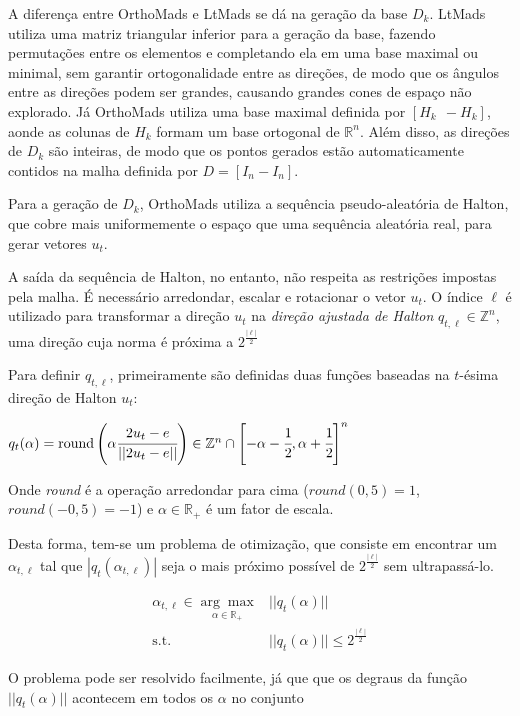 A diferença entre OrthoMads e LtMads se dá na geração da base $D_k$. 
%
LtMads utiliza uma matriz triangular inferior para a geração da base, fazendo permutações entre os elementos e completando ela em uma base maximal ou minimal, sem garantir ortogonalidade entre as direções, de modo que os ângulos entre as direções podem ser grandes, causando grandes cones de espaço não explorado.
%
Já OrthoMads utiliza uma base maximal definida por $[H_k~~ -H_k]$, aonde as colunas de $H_k$ formam um base ortogonal de $\mathbb{R}^n$. Além disso, as direções de $D_k$ são inteiras, de modo que os pontos gerados estão automaticamente contidos na malha definida por $D=[I_n -I_n]$.

Para a geração de $D_k$, OrthoMads utiliza a sequência pseudo-aleatória de Halton, que cobre mais uniformemente o espaço que uma sequência aleatória real, para  gerar vetores $u_t$.

A saída da sequência de Halton, no entanto, não respeita as restrições impostas pela malha. É necessário arredondar, escalar e rotacionar o vetor $u_t$. O índice $\ell$ é utilizado para transformar a direção $u_t$ na \textit{direção ajustada de Halton} $q_{t,\ell} \in \mathbb{Z}^n$, uma direção cuja norma é próxima a $2^{\frac{|\ell|}{2}}$


Para definir $q_{t,\ell}$, primeiramente são definidas duas funções baseadas na $t$-ésima direção de Halton $u_t$:

$q_t(\alpha) = \text{round} \left ( \alpha \cfrac{2u_t - e}{||2u_t - e||} \right ) \in \mathbb{Z}^n \cap \left [ -\alpha - \cfrac{1}{2}, \alpha + \cfrac{1}{2}  \right ]^n$
	
Onde \textit{round} é a operação arredondar para cima ($round(0,5)=1$, $round(-0,5) = -1$) e $\alpha \in \mathbb{R}_+$ é um fator de escala. 

Desta forma, tem-se um problema de otimização, que consiste em encontrar um $\alpha_{t,\ell}$ tal que $|q_t(\alpha_{t,\ell})|$ seja o mais próximo possível de $2^{\frac{|\ell|}{2}}$ sem ultrapassá-lo.

\begin{align*}
\alpha_{t,\ell} \in \underset{\alpha \in \mathbb{R}_+}{\arg\max} & ||q_t(\alpha)|| \\
\text{s.t.} & ||q_t(\alpha)|| \leq 2^{\frac{|\ell|}{2}}
\end{align*}

O problema pode ser resolvido facilmente, já que que os degraus da função $||q_t(\alpha)||$ acontecem em todos os $\alpha$ no conjunto


